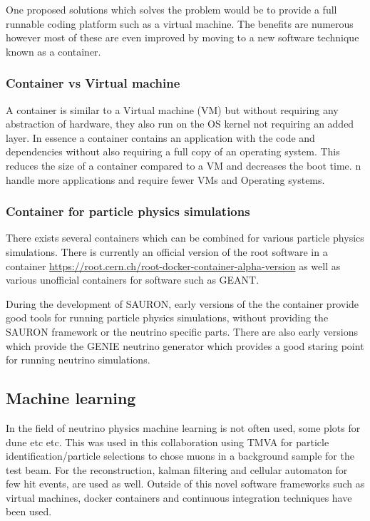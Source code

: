 One proposed solutions which solves the problem would be to provide a full runnable coding platform such as a virtual machine. The benefits are numerous however most of these are even improved by moving to a new software technique known as a container.

\subsubsection{Container vs Virtual machine}

A container is similar to a Virtual machine (VM) but without requiring any abstraction of hardware, they also run on the OS kernel not requiring an added layer. In essence a container contains an application with the code and dependencies without also requiring a full copy of an operating system. This reduces the size of a container compared to a VM and decreases the boot time.
n handle more applications and require fewer VMs and Operating systems.

\subsubsection{Container for particle physics simulations}
There exists several containers which can be combined for various particle physics simulations. There is currently an official version of the root software in a container \url{https://root.cern.ch/root-docker-container-alpha-version} as well as various unofficial containers for software such as GEANT.

During the development of SAURON, early versions of the the container provide good tools for running particle physics simulations, without providing the SAURON framework or the neutrino specific parts. There are also early versions which provide the GENIE neutrino generator which provides a good staring point for running neutrino simulations.


\subsection{Machine learning}

In the field of neutrino physics machine learning  is not often used, some plots for dune etc etc. This was used in this collaboration using TMVA for particle identification/particle selections to chose muons in a background sample for the test beam.
For the reconstruction, kalman filtering and cellular automaton for few hit events, are used as well.
Outside of this novel software frameworks such as virtual machines, docker containers and continuous integration techniques have been used.

